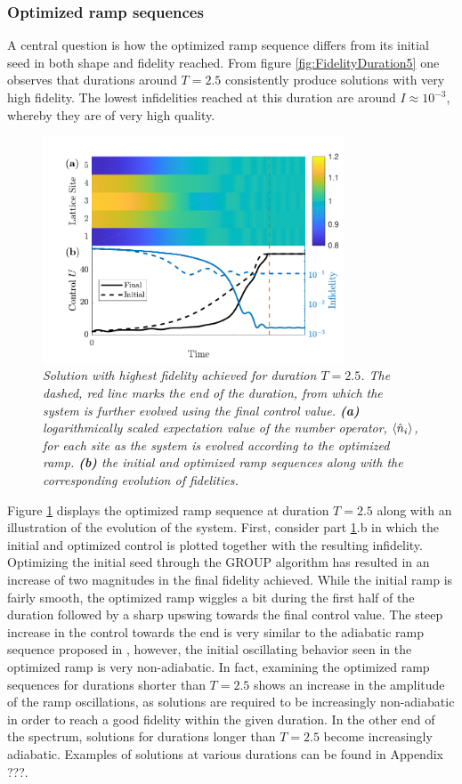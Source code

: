\subsubsection{Optimized ramp sequences}
A central question is how the optimized ramp sequence differs from its initial seed in both shape and fidelity reached. From figure \ref{fig:FidelityDuration5} one observes that durations around $T = 2.5$ consistently produce solutions with very high fidelity. The lowest infidelities reached at this duration are around $I \approx 10^{-3}$, whereby they are of very high quality. 
\begin{figure}[h!]
    \centering
    \includegraphics[width=0.8\textwidth]{Figures/5part/ExtendedRampT25.pdf}
    \caption{\textit{Solution with highest fidelity achieved for duration $T = 2.5$. The dashed, red line marks the end of the duration, from which the system is further evolved using the final control value. \textbf{(a)} logarithmically scaled expectation value of the number operator, $\braket{\hat{n}_i}$, for each site as the system is evolved according to the optimized ramp. \textbf{(b)} the initial and optimized ramp sequences along with the corresponding evolution of fidelities.}}
    \label{fig:ExtendedRamp5}
\end{figure}
Figure \ref{fig:ExtendedRamp5} displays the optimized ramp sequence at duration $T = 2.5$ along with an illustration of the evolution of the system. First, consider part \ref{fig:ExtendedRamp5}.b in which the initial and optimized control is plotted together with the resulting infidelity. Optimizing the initial seed through the GROUP algorithm has resulted in an increase of two magnitudes in the final fidelity achieved.
While the initial ramp is fairly smooth, the optimized ramp wiggles a bit during the first half of the duration followed by a sharp upswing towards the final control value. The steep increase in the control towards the end is very similar to the adiabatic ramp sequence proposed in \cite{Zakrzewski2009}, however, the initial oscillating behavior seen in the optimized ramp is very non-adiabatic. In fact, examining the optimized ramp sequences for durations shorter than $T = 2.5$ shows an increase in the amplitude of the ramp oscillations, as solutions are required to be increasingly non-adiabatic in order to reach a good fidelity within the given duration. In the other end of the spectrum, solutions for durations longer than $T = 2.5$ become increasingly adiabatic. Examples of solutions at various durations can be found in Appendix ???.\\
